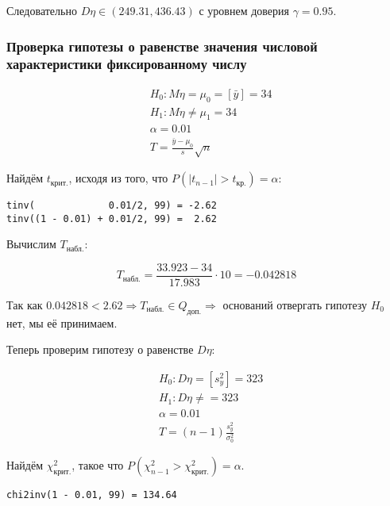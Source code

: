 \documentclass{report}
\begin{document}
Следовательно $D\eta \in \left ( 249.31, 436.43 \right )$ с уровнем доверия $\gamma = 0.95$.

\subsubsection*{Проверка гипотезы о равенстве значения числовой характеристики фиксированному числу}

\begin{equation*}
\begin{split}
& H_0 : M\eta = \mu_0 = [\bar y] = 34 \\
& H_1 : M\eta \ne \mu_1 = 34 \\
& \alpha = 0.01 \\
& T = \frac{\bar y - \mu_0}{s} \sqrt{n}
\end{split}
\end{equation*}

Найдём $t_{\text{крит.}}$, исходя из того, что $P\left( |t_{n-1}| > t_{\text{кр.}} \right) = \alpha$:

\begin{lstlisting}
tinv(             0.01/2, 99) = -2.62
tinv((1 - 0.01) + 0.01/2, 99) =  2.62
\end{lstlisting}

Вычислим $T_\text{набл.}$:

\begin{equation}
T_\text{набл.} = \frac{33.923 - 34}{17.983} \cdot 10 = -0.042818
\end{equation}

Так как $0.042818 < 2.62 \Rightarrow T_\text{набл.} \in Q_\text{доп.} \Rightarrow$ оснований отвергать гипотезу $H_0$ нет, мы её принимаем. 

Теперь проверим гипотезу о равенстве $D\eta$:

\begin{equation*}
\begin{split}
& H_0 : D\eta = [s_y^2] = 323 \\
& H_1 : D\eta \ne = 323 \\
& \alpha = 0.01 \\
& T = \left(n-1\right)\frac{s^2_y}{\sigma_0^2}
\end{split}
\end{equation*}

Найдём $\chi^2_\text{крит.}$, такое что $P\left(\chi^2_{n-1} > \chi^2_\text{крит.}\right) = \alpha$.

\begin{lstlisting}
chi2inv(1 - 0.01, 99) = 134.64
\end{lstlisting}
\end{document}
